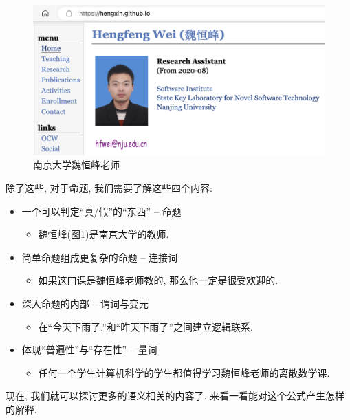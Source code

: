 \begin{figure}[!htbp]
		\begin{center}
			\includegraphics[scale=0.5]{2-prop-logic/figs/hfwei.png}
		\end{center}
		
		\caption{南京大学魏恒峰老师}
		\label{fig:hfwei}
\end{figure}

\begin{idea}
	除了这些, 对于命题, 我们需要了解这些四个内容: 
\begin{itemize}
	\item 一个可以判定“真/假”的“东西” – 命题
	\begin{itemize}
		\item 魏恒峰(图\ref{fig:hfwei})是南京大学的教师.
	\end{itemize}
	\item 简单命题组成更复杂的命题 – 连接词
	\begin{itemize}
		\item 如果这门课是魏恒峰老师教的, 那么他一定是很受欢迎的. 
	\end{itemize}
	\item 深入命题的内部 – 谓词与变元
	\begin{itemize}
		\item 在“今天下雨了.”和“昨天下雨了”之间建立逻辑联系.
	\end{itemize}
	\item 体现“普遍性”与“存在性” – 量词
	\begin{itemize}
		\item 任何一个学生计算机科学的学生都值得学习魏恒峰老师的离散数学课. 
	\end{itemize}
	
\end{itemize}


	
	
	
现在, 我们就可以探讨更多的语义相关的内容了. 来看一看能对这个公式产生怎样的解释. 

\end{idea}


